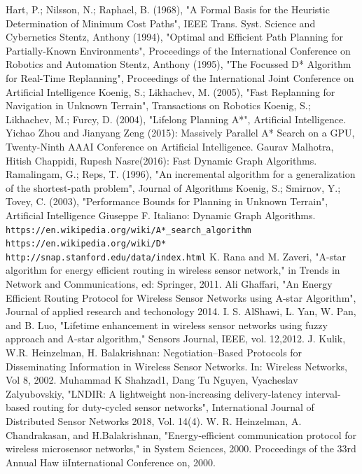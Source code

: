 \documentclass[a4paper]{article}
\begin{document}
\begin{thebibliography}{} 
     Hart, P.; Nilsson, N.; Raphael, B. (1968), "A Formal Basis for the Heuristic Determination of Minimum Cost Paths", IEEE Trans. Syst. Science and Cybernetics
    Stentz, Anthony (1994), "Optimal and Efficient Path Planning for Partially-Known Environments", Proceedings of the International Conference on Robotics and Automation
    Stentz, Anthony (1995), "The Focussed D* Algorithm for Real-Time Replanning", Proceedings of the International Joint Conference on Artificial Intelligence
    Koenig, S.; Likhachev, M. (2005), "Fast Replanning for Navigation in Unknown Terrain", Transactions on Robotics
    Koenig, S.; Likhachev, M.; Furcy, D. (2004), "Lifelong Planning A*", Artificial Intelligence.
    Yichao Zhou and Jianyang Zeng (2015): Massively Parallel A* Search on a GPU, Twenty-Ninth AAAI Conference on Artificial Intelligence.
    Gaurav Malhotra, Hitish Chappidi, Rupesh Nasre(2016): Fast Dynamic Graph Algorithms.
     Ramalingam, G.; Reps, T. (1996), "An incremental algorithm for a generalization of the shortest-path problem", Journal of Algorithms
    Koenig, S.; Smirnov, Y.; Tovey, C. (2003), "Performance Bounds for Planning in Unknown Terrain", Artificial Intelligence
    Giuseppe F. Italiano: Dynamic Graph Algorithms.
    \texttt{https://en.wikipedia.org/wiki/A*\_search\_algorithm}
    \texttt{https://en.wikipedia.org/wiki/D*}
    \texttt{http://snap.stanford.edu/data/index.html}
    K. Rana and M. Zaveri, "A-star algorithm for energy efficient routing in wireless sensor network," in Trends in Network and Communications, ed: Springer, 2011.
    Ali Ghaffari, "An Energy Efficient Routing Protocol for Wireless Sensor Networks using A-star Algorithm", Journal of applied research and techonology 2014.
    I. S. AlShawi, L. Yan, W. Pan, and B. Luo, "Lifetime enhancement in wireless sensor networks using fuzzy approach and A-star algorithm," Sensors Journal, IEEE, vol. 12,2012.
    J. Kulik, W.R. Heinzelman, H. Balakrishnan: Negotiation–Based Protocols for Disseminating Information in Wireless Sensor Networks. In: Wireless Networks, Vol 8, 2002.
    Muhammad K Shahzad1, Dang Tu Nguyen, Vyacheslav Zalyubovskiy, "LNDIR: A lightweight non-increasing delivery-latency interval-based routing for duty-cycled sensor networks", International Journal of Distributed Sensor Networks 2018, Vol. 14(4).
    W. R. Heinzelman, A. Chandrakasan, and H.Balakrishnan, "Energy-efficient communication protocol for wireless microsensor networks," in System Sciences, 2000. Proceedings of the 33rd Annual Haw iiInternational Conference on, 2000.
    
  
\end{thebibliography} 
\end{document}
